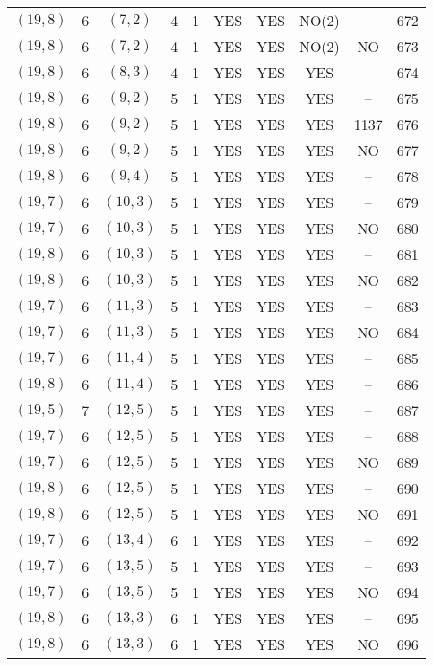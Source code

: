 \begin{longtable}{|c|c|c|c|c|c|c|c|c|c|}
$(19, 8)$ & 6 & $(7, 2)$ & 4 & 1 & YES & YES & NO(2) & -- & 672\\
$(19, 8)$ & 6 & $(7, 2)$ & 4 & 1 & YES & YES & NO(2) & NO & 673\\
$(19, 8)$ & 6 & $(8, 3)$ & 4 & 1 & YES & YES & YES & -- & 674\\
$(19, 8)$ & 6 & $(9, 2)$ & 5 & 1 & YES & YES & YES & -- & 675\\
$(19, 8)$ & 6 & $(9, 2)$ & 5 & 1 & YES & YES & YES & 1137 & 676\\
$(19, 8)$ & 6 & $(9, 2)$ & 5 & 1 & YES & YES & YES & NO & 677\\
$(19, 8)$ & 6 & $(9, 4)$ & 5 & 1 & YES & YES & YES & -- & 678\\
$(19, 7)$ & 6 & $(10, 3)$ & 5 & 1 & YES & YES & YES & -- & 679\\
$(19, 7)$ & 6 & $(10, 3)$ & 5 & 1 & YES & YES & YES & NO & 680\\
$(19, 8)$ & 6 & $(10, 3)$ & 5 & 1 & YES & YES & YES & -- & 681\\
$(19, 8)$ & 6 & $(10, 3)$ & 5 & 1 & YES & YES & YES & NO & 682\\
$(19, 7)$ & 6 & $(11, 3)$ & 5 & 1 & YES & YES & YES & -- & 683\\
$(19, 7)$ & 6 & $(11, 3)$ & 5 & 1 & YES & YES & YES & NO & 684\\
$(19, 7)$ & 6 & $(11, 4)$ & 5 & 1 & YES & YES & YES & -- & 685\\
$(19, 8)$ & 6 & $(11, 4)$ & 5 & 1 & YES & YES & YES & -- & 686\\
$(19, 5)$ & 7 & $(12, 5)$ & 5 & 1 & YES & YES & YES & -- & 687\\
$(19, 7)$ & 6 & $(12, 5)$ & 5 & 1 & YES & YES & YES & -- & 688\\
$(19, 7)$ & 6 & $(12, 5)$ & 5 & 1 & YES & YES & YES & NO & 689\\
$(19, 8)$ & 6 & $(12, 5)$ & 5 & 1 & YES & YES & YES & -- & 690\\
$(19, 8)$ & 6 & $(12, 5)$ & 5 & 1 & YES & YES & YES & NO & 691\\
$(19, 7)$ & 6 & $(13, 4)$ & 6 & 1 & YES & YES & YES & -- & 692\\
$(19, 7)$ & 6 & $(13, 5)$ & 5 & 1 & YES & YES & YES & -- & 693\\
$(19, 7)$ & 6 & $(13, 5)$ & 5 & 1 & YES & YES & YES & NO & 694\\
$(19, 8)$ & 6 & $(13, 3)$ & 6 & 1 & YES & YES & YES & -- & 695\\
$(19, 8)$ & 6 & $(13, 3)$ & 6 & 1 & YES & YES & YES & NO & 696\\

\end{longtable}
